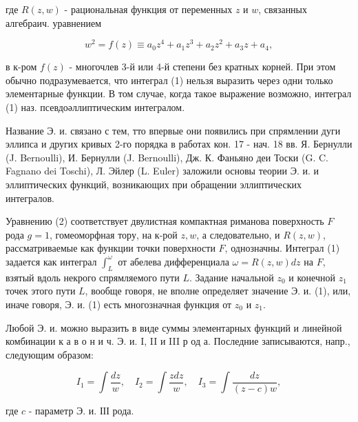 \documentclass[10pt]{article}
\begin{document}
где $R(z, w)$ - рациональная функция от переменных $z$ и $w$, связанных алгебраич. уравнением



\[

w^{2}=f(z) \equiv a_{0} z^{4}+a_{1} z^{3}+a_{2} z^{2}+a_{3} z+a_{4},

\]



в к-ром $f(z)$ - многочлев 3-й или 4-й степени без кратных корней. При этом обычно подразумевается, что интеграл (1) нельзя выразить через одни только элементарные функции. В том случае, когда такое выражение возможно, интеграл (1) наз. псевдоәллиптическим интегралом.



Название Э. и. связано с тем, тто впервые они появились при спрямлении дуги эллипса и других кривых 2-го порядка в работах кон. 17 - нач. 18 вв. Я. Бернулли (J. Bernoulli), И. Бернулли (J. Bernoulli), Дж. К. Фаньяно деи Тоски (G. C. Fagnano dei Toschi), Л. Эйлер (L. Euler) заложили основы теории Э. и. и эллиптических функций, возникающих при обращении эллиптических интегралов.



Уравнению (2) соответствует двулистная компактная риманова поверхность $F$ рода $g=1$, гомеоморфная тору, на к-рой $z, w$, а следовательно, и $R(z, w)$, рассматриваемые как функции точки поверхности $F$, однозначны. Интеграл (1) задается как интеграл $\int_{L}^{\omega}$ от абелева дифференциала $\omega=R(z, w) d z$ на $F$, взятый вдоль некрого спрямляемого пути $L$. Задание начальной $z_{0}$ и конечной $z_{1}$ точек этого пути $L$, вообще говоря, не вполне определяет значение Э. и. (1), или, иначе говоря, Э. и. (1) есть многозначная функция от $z_{0}$ и $z_{1}$.



Любой Э. и. можно выразить в виде суммы элементарных функций и линейной комбинации к а в о н и ч. Э. и. I, II и III р од а. Последние записываются, напр., следующим образом:



\[

I_{1}=\int \frac{d z}{w}, \quad I_{2}=\int \frac{z d z}{w}, \quad I_{3}=\int \frac{d z}{(z-c) w},

\]



где $c$ - параметр Э. и. ІІІ рода.
\end{document}
